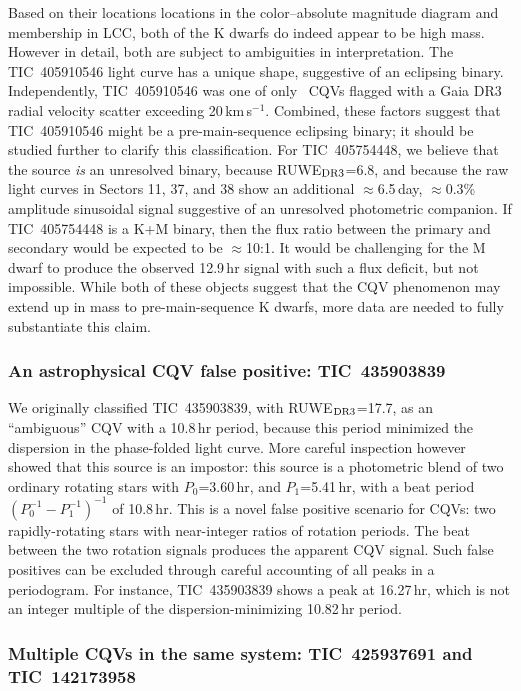 \documentclass[11pt,twocolumn,tighten]{aastex63}
\newcommand{\kms}{{km\,s$^{-1}$}}
\begin{document}
Based on their locations locations in the color--absolute magnitude
diagram and membership in LCC, both of the K dwarfs do indeed appear
to be high mass.  However in detail, both are subject to ambiguities
in interpretation.  The TIC~405910546 light curve has a unique shape,
suggestive of an eclipsing binary.  Independently, TIC~405910546 was
one of only \nrvscatterflag\ CQVs flagged with a Gaia DR3 radial
velocity scatter exceeding 20\,\kms.  Combined, these factors suggest
that TIC~405910546 might be a pre-main-sequence eclipsing binary; it
should be studied further to clarify this classification.  For
TIC~405754448, we believe that the source {\it is} an unresolved
binary, because RUWE$_{\rm DR3}$=6.8, and because the raw light curves
in Sectors 11, 37, and 38 show an additional $\approx$6.5\,day,
$\approx$0.3\% amplitude sinusoidal signal suggestive of an unresolved
photometric companion.  If TIC~405754448 is a K+M binary, then the
flux ratio between the primary and secondary would be expected to be
$\approx$10:1.  It would be challenging for the M dwarf to produce the
observed 12.9\,hr signal with such a flux deficit, but not impossible.
While both of these objects suggest that the CQV phenomenon may extend
up in mass to pre-main-sequence K dwarfs, more data are needed to
fully substantiate this claim.

\subsubsection{An astrophysical CQV false positive: TIC~435903839}

We originally classified TIC~435903839, with RUWE$_{\rm DR3}$=17.7, as
an ``ambiguous'' CQV with a 10.8\,hr period, because this period
minimized the dispersion in the phase-folded light curve.  More
careful inspection however showed that this source is an impostor:
this source is a photometric blend of two ordinary rotating stars with
$P_0$=3.60\,hr, and $P_1$=5.41\,hr, with a beat period $(P_0^{-1} -
P_1^{-1})^{-1}$ of 10.8\,hr.  This is a novel false positive scenario
for CQVs: two rapidly-rotating stars with near-integer ratios of
rotation periods.  The beat between the two rotation signals produces
the apparent CQV signal.  Such false positives can be excluded through
careful accounting of all peaks in a periodogram.  For instance,
TIC~435903839 shows a peak at 16.27\,hr, which is not an integer
multiple of the dispersion-minimizing 10.82\,hr period.

\subsubsection{Multiple CQVs in the same system: TIC~425937691 and TIC~142173958}
\end{document}

